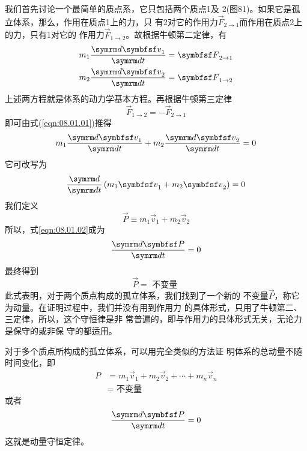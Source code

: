 我们首先讨论一个最简单的质点系，它只包括两个质点1及
2(图81)。如果它是孤立体系，那么，作用在质点1上的力，只
有2对它的作用力$ \vec { F } _ { 2 \to 1 } $而作用在质点2上的力，只有1对它的
作用力$ \vec { F } _ { 1 \to 2 } $。故根据牛顿第二定律，有
\begin{equation}\label{eqn:08.01.01}
    \begin{split}
    m _ { 1 } \frac { \dif \vec { v } _ { 1 } } { \dif t } = \vec { F } _ { 2 \to 1 }  \\
    m _ { 2 } \frac { \dif \vec { v } _ { 2 } } { \dif t } = \vec { F } _ { 1 \to 2 }
    \end{split}
\end{equation}
上述两方程就是体系的动力学基本方程。再根据牛顿第三定律
\begin{equation*}
    \vec { F } _ { 1 \to 2 } = - \vec { F } _ { 2 \to 1 }
\end{equation*}
即可由式(\eqref{eqn:08.01.01})推得
\begin{equation*}
    m _ { 1 } \frac { \dif \vec { v } _ { 1 } } { \dif t } + m _ { 2 } \frac { \dif \vec { v } _ { 2 } } { \dif t } = 0
\end{equation*}
它可改写为
\begin{equation}\label{eqn:08.01.02}
    \frac { \dif } { \dif t } \left( m _ { 1 } \vec { v } _ { 1 } + m _ { 2 } \vec { v } _ { 2 } \right) = 0
\end{equation}
我们定义
\begin{equation}\label{eqn:08.01.03}
    \vec{ P } \equiv m _ { 1 } \vec { v } _ { 1 } + m _ { 2 } \vec { v } _ { 2 }
\end{equation}
所以，式\eqref{eqn:08.01.02}成为
\begin{equation}\label{eqn:08.01.04}
    \frac { \dif \vec { P } } { \dif t } = 0
\end{equation}
最终得到
\begin{equation}\label{eqn:08.01.05}
    \vec { P } = \text { 不变量 }
\end{equation}
此式表明，对于两个质点构成的孤立体系，我们找到了一个新的
不变量$ \vec { P } $，称它为动量。在证明过程中，我们并没有用到作用力
的具体形式，只用了牛顿第二、三定律，所以，这个守恒律是非
常普遍的，即与作用力的具体形式无关，无论力是保守的或非保
守的都适用。

对于多个质点所构成的孤立体系，可以用完全类似的方法证
明体系的总动量不随时间变化，即
\begin{equation}\label{eqn:08.01.06}
    \begin{aligned}
        P &= m _ { 1 } \vec { v } _ { 1 } + m _ { 2 } \vec { v } _ { 2 } + \cdots + m _ { n } \vec { v } _ { n }  \\
        &= \text { 不变量 }
    \end{aligned}
\end{equation}
或者\vspace{-1.56em}
\begin{equation}\label{eqn:08.01.07}
    \frac { \dif \vec { P } } { \dif t } = 0
\end{equation}
这就是动量守恒定律。

